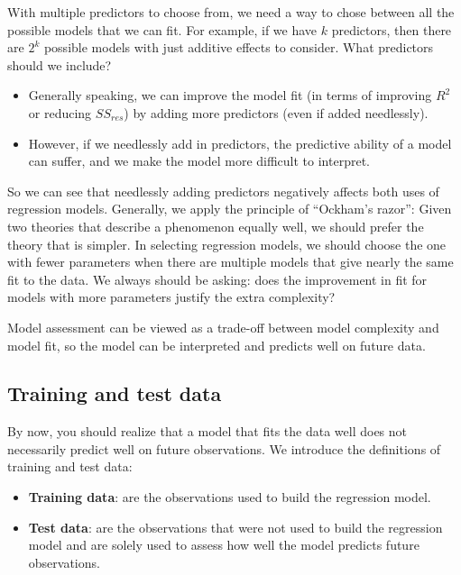 \documentclass[
]{book}
\providecommand{\tightlist}{%
  \setlength{\itemsep}{0pt}\setlength{\parskip}{0pt}}
\begin{document}
With multiple predictors to choose from, we need a way to chose between all the possible models that we can fit. For example, if we have \(k\) predictors, then there are \(2^{k}\) possible models with just additive effects to consider. What predictors should we include?

\begin{itemize}
\item
  Generally speaking, we can improve the model fit (in terms of improving \(R^2\) or reducing \(SS_{res}\)) by adding more predictors (even if added needlessly).
\item
  However, if we needlessly add in predictors, the predictive ability of a model can suffer, and we make the model more difficult to interpret.
\end{itemize}

So we can see that needlessly adding predictors negatively affects both uses of regression models. Generally, we apply the principle of ``Ockham's razor'':
Given two theories that describe a phenomenon equally well, we should prefer the theory that is simpler. In selecting regression models, we should choose the one with fewer parameters when there are multiple models that give nearly the same fit to the data. We always should be asking: does the improvement in fit for models with more parameters justify the extra complexity?

Model assessment can be viewed as a trade-off between model complexity and model fit, so the model can be interpreted and predicts well on future data.

\hypertarget{training-and-test-data}{%
\subsection{Training and test data}\label{training-and-test-data}}

By now, you should realize that a model that fits the data well does not necessarily predict well on future observations. We introduce the definitions of training and test data:

\begin{itemize}
\tightlist
\item
  \textbf{Training data}: are the observations used to build the regression model.
\item
  \textbf{Test data}: are the observations that were not used to build the regression model and are solely used to assess how well the model predicts future observations.
\end{itemize}
\end{document}
